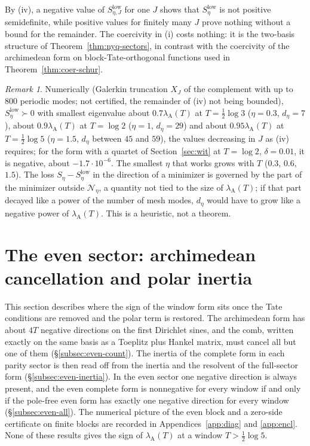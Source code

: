 \documentclass[11pt]{amsart}
\theoremstyle{definition}
\theoremstyle{remark}
\newtheorem{remark}[theorem]{Remark}
\newcommand{\lamA}{\lambda_{\mathrm A}(T)}
\begin{document}
By (iv), a negative value of $S^{\mathrm{low}}_{\eta,J}$ for one $J$ shows that $S^{\mathrm{low}}_\eta$ is not
positive semidefinite, while positive values for finitely many $J$ prove nothing without a bound for the remainder.
The coercivity in (i) costs nothing: it is the two-basis structure of Theorem~\ref{thm:nyq-sectors}, in contrast with
the coercivity of the archimedean form on block-Tate-orthogonal functions used in Theorem~\ref{thm:coer-schur}.

\begin{remark}\label{rem:nyq-schur-num}
Numerically (Galerkin truncation $X_J$ of the complement with up to $800$ periodic modes; not certified, the
remainder of (iv) not being bounded), $S^{\mathrm{low}}_\eta\succ0$ with smallest eigenvalue about $0.7\lamA$ at
$T=\frac12\log3$ ($\eta=0.3$, $d_\eta=7$), about $0.9\lamA$ at $T=\log2$ ($\eta=1$, $d_\eta=29$) and about $0.95\lamA$ at
$T=\frac12\log5$ ($\eta=1.5$, $d_\eta$ between $45$ and $59$), the values decreasing in $J$ as (iv) requires; for the
form with a quartet of Section~\ref{sec:wit} at $T=\log2$, $\delta=0.01$, it is negative, about $-1.7\cdot10^{-6}$. The
smallest $\eta$ that works grows with $T$ ($0.3$, $0.6$, $1.5$). The loss $S_\eta-S^{\mathrm{low}}_\eta$ in the direction of a
minimizer is governed by the part of the minimizer outside $\mathcal N_\eta$, a quantity not tied to the size of $\lamA$;
if that part decayed like a power of the number of mesh modes, $d_\eta$ would have to grow like a negative power of
$\lamA$. This is a heuristic, not a theorem.
\end{remark}


\section{The even sector: archimedean cancellation and polar inertia}\label{sec:evensign}

This section describes where the sign of the window form sits once the Tate conditions are removed and the
polar term is restored. The archimedean form has about $4T$ negative directions on the first Dirichlet sines,
and the comb, written exactly on the same basis as a Toeplitz plus Hankel matrix, must cancel all but one of
them (\S\ref{subsec:even-count}). The inertia of the complete form in each parity sector is then read off from the
inertia and the resolvent of the full-sector form (\S\ref{subsec:even-inertia}). In the even sector one negative
direction is always present, and the even complete form is nonnegative for every window if and only if the
pole-free even form has exactly one negative direction for every window (\S\ref{subsec:even-all}). The numerical
picture of the even block and a zero-side certificate on finite blocks are recorded in
Appendices~\ref{app:diag} and \ref{app:encl}. None of these results gives the sign of $\lamA$ at a window
$T>\frac12\log5$.
\end{document}
